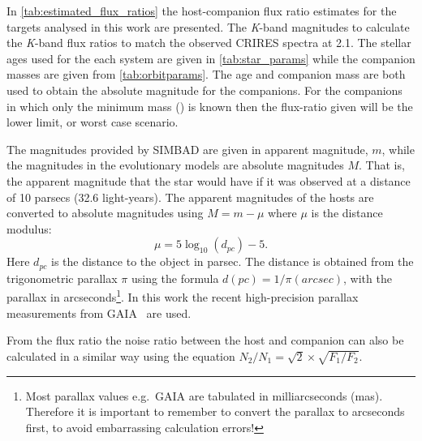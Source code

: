 In \cref{tab:estimated_flux_ratios} the host-companion flux ratio estimates for the targets analysed in this work are presented.
The \emph{K}-band magnitudes to calculate the \emph{K}-band flux ratios to match the observed {CRIRES} spectra at 2.1\um{}.
The stellar ages used for the each system are given in \cref{tab:star_params} while the companion masses are given from \cref{tab:orbitparams}.
The age and companion mass are both used to obtain the absolute magnitude for the companions.
For the companions in which only the minimum mass (\Mtwosini{}) is known then the flux-ratio given will be the lower limit, or worst case scenario.


The magnitudes provided by {SIMBAD} are given in apparent magnitude, \(m\), while the magnitudes in the evolutionary models are absolute magnitudes \(M\).
That is, the apparent magnitude that the star would have if it was observed at a distance of 10 parsecs (32.6 light-years).
The apparent magnitudes of the hosts are converted to absolute magnitudes using \(M = m - \mu\) where \(\mu\) is the distance modulus:
\begin{equation}
\mu = 5 \log_{10}(d_{pc}) -5.\label{eqn:distance_modulus}
\end{equation}
Here $d_{pc}$ is the distance to the object in parsec.
The distance is obtained from the trigonometric parallax  $\pi$ using the formula $d(pc) = 1 /\pi(arcsec)$, with the parallax in arcseconds\footnote{Most parallax values e.g.\ GAIA are tabulated in milliarcseconds (mas).
Therefore it is important to remember to convert the parallax to arcseconds first, to avoid embarrassing calculation errors!}.
In this work the recent high-precision parallax measurements from GAIA~\citep{gaiacollaboration_gaia_2018} are used.

From the flux ratio the noise ratio between the host and companion can also be calculated in a similar way using the equation \(N_{2}/N_{1} = \sqrt{2} \times\sqrt{F_{1}/F_{2}}\).



